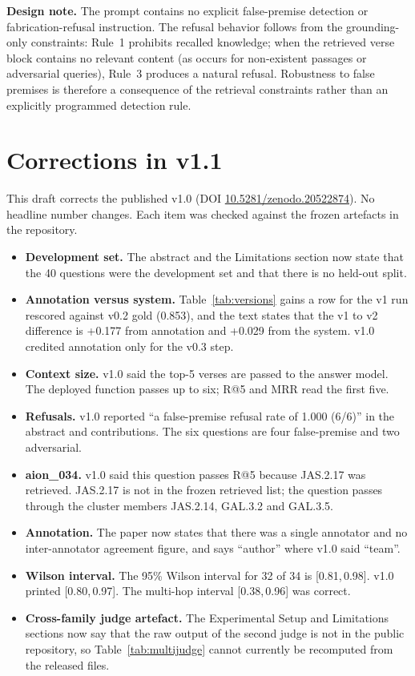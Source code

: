 \documentclass[11pt]{article}
\begin{document}
\textbf{Design note.}
The prompt contains no explicit false-premise detection or fabrication-refusal instruction.
The refusal behavior follows from the grounding-only constraints: Rule~1 prohibits recalled knowledge; when the retrieved verse block contains no relevant content (as occurs for non-existent passages or adversarial queries), Rule~3 produces a natural refusal. Robustness to false premises is therefore a consequence of the retrieval constraints rather than an explicitly programmed detection rule.

\section{Corrections in v1.1}
\label{app:corrections}

This draft corrects the published v1.0 (DOI \href{https://doi.org/10.5281/zenodo.20522874}{10.5281/zenodo.20522874}). No headline number changes. Each item was checked against the frozen artefacts in the repository.

\begin{itemize}
  \item \textbf{Development set.} The abstract and the Limitations section now state that the 40 questions were the development set and that there is no held-out split.
  \item \textbf{Annotation versus system.} Table~\ref{tab:versions} gains a row for the v1 run rescored against v0.2 gold (0.853), and the text states that the v1 to v2 difference is +0.177 from annotation and +0.029 from the system. v1.0 credited annotation only for the v0.3 step.
  \item \textbf{Context size.} v1.0 said the top-5 verses are passed to the answer model. The deployed function passes up to six; R@5 and MRR read the first five.
  \item \textbf{Refusals.} v1.0 reported ``a false-premise refusal rate of 1.000 (6/6)'' in the abstract and contributions. The six questions are four false-premise and two adversarial.
  \item \textbf{aion\_034.} v1.0 said this question passes R@5 because JAS.2.17 was retrieved. JAS.2.17 is not in the frozen retrieved list; the question passes through the cluster members JAS.2.14, GAL.3.2 and GAL.3.5.
  \item \textbf{Annotation.} The paper now states that there was a single annotator and no inter-annotator agreement figure, and says ``author'' where v1.0 said ``team''.
  \item \textbf{Wilson interval.} The 95\% Wilson interval for 32 of 34 is [0.81,\,0.98]. v1.0 printed [0.80,\,0.97]. The multi-hop interval [0.38,\,0.96] was correct.
  \item \textbf{Cross-family judge artefact.} The Experimental Setup and Limitations sections now say that the raw output of the second judge is not in the public repository, so Table~\ref{tab:multijudge} cannot currently be recomputed from the released files.
\end{itemize}
\end{document}

